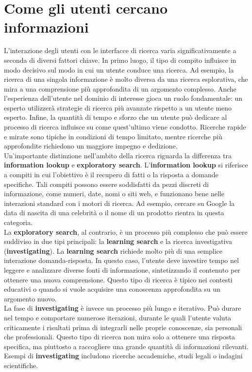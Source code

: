 \documentclass{report}
\begin{document}
	\section{Come gli utenti cercano informazioni}
	L'interazione degli utenti con le interfacce di ricerca varia significativamente a seconda di diversi fattori chiave. In primo luogo, il tipo di compito influisce in modo decisivo sul modo in cui un utente conduce una ricerca. Ad esempio, la ricerca di una singola informazione è molto diversa da una ricerca esplorativa, che mira a una comprensione più approfondita di un argomento complesso. Anche l'esperienza dell'utente nel dominio di interesse gioca un ruolo fondamentale: un esperto utilizzerà strategie di ricerca più avanzate rispetto a un utente meno esperto. Infine, la quantità di tempo e sforzo che un utente può dedicare al processo di ricerca influisce su come quest'ultimo viene condotto. Ricerche rapide e mirate sono tipiche in condizioni di tempo limitato, mentre ricerche più approfondite richiedono un maggiore impegno e dedizione.
	\vspace{\baselineskip}\\
	Un'importante distinzione nell'ambito della ricerca riguarda la differenza tra \textbf{information lookup} e \textbf{exploratory search}. L'\textbf{information lookup} si riferisce a compiti in cui l'obiettivo è il recupero di fatti o la risposta a domande specifiche. Tali compiti possono essere soddisfatti da pezzi discreti di informazione, come numeri, date, nomi o siti web, e funzionano bene nelle interazioni standard con i motori di ricerca. Ad esempio, cercare su Google la data di nascita di una celebrità o il nome di un prodotto rientra in questa categoria.
	\vspace{\baselineskip}\\
	La \textbf{exploratory search}, al contrario, è un processo più complesso che può essere suddiviso in due tipi principali: la \textbf{learning search} e la ricerca investigativa (\textbf{investigating}). La \textbf{learning search} richiede molto più di una semplice interazione domanda-risposta. In questo caso, l'utente deve investire tempo nel leggere e analizzare diverse fonti di informazione, sintetizzando il contenuto per ottenere una nuova comprensione. Questo tipo di ricerca è tipico nei contesti educativi o quando si vuole acquisire una conoscenza approfondita su un argomento nuovo.
	\vspace{\baselineskip}\\
	La fase di \textbf{investigating} è invece un processo più lungo e iterativo. Può durare nel tempo e comportare numerose iterazioni, durante le quali l'utente valuta criticamente i risultati prima di integrarli nelle proprie conoscenze, sia personali che professionali. Questo tipo di ricerca non mira solo a ottenere una risposta specifica, ma piuttosto a raccogliere una grande quantità di informazioni rilevanti. Esempi di \textbf{investigating} includono ricerche accademiche, studi legali o indagini scientifiche.
\end{document}
